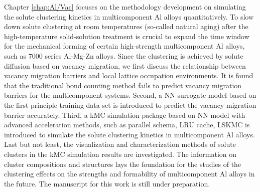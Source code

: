 Chapter \ref{chap:Al/Vac} focuses on the methodology development on simulating the solute clustering kinetics in multicomponent Al alloys quantitatively. To slow down solute clustering at room temperatures (so-called natural aging) after the high-temperature solid-solution treatment is crucial to expand the time window for the mechanical forming of certain high-strength multicomponent Al alloys, such as 7000 series Al-Mg-Zn alloys. Since the clustering is achieved by solute diffusion based on vacancy migration, we first discuss the relationship between vacancy migration barriers and local lattice occupation environments. It is found that the traditional bond counting method fails to predict vacancy migration barriers for the multicomponent systems. Second, a \acf{NN} surrogate model based on the first-principle training data set is introduced to predict the vacancy migration barrier accurately. Third, a \acf{kMC} simulation package based on \ac{NN} model with advanced acceleration methods, such as parallel schema, \acf{LRU} cache, \acf{LSKMC} is introduced to simulate the solute clustering kinetics in multicomponent Al alloys. Last but not least, the visualization and characterization methods of solute clusters in the kMC simulation results are investigated. The information on cluster compositions and structures lays the foundation for the studies of the clustering effects on the strengths and formability of multicomponent Al alloys in the future. The manuscript for this work is still under preparation.

